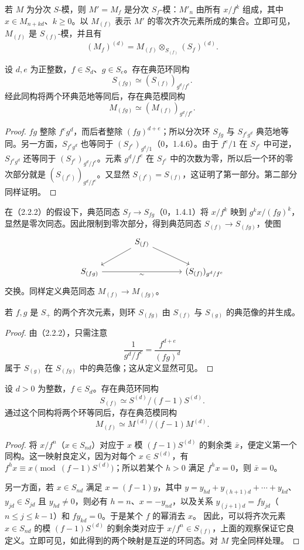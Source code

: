 若 $M$ 为分次 $S$-模，则 $M'=M_f$ 是分次 $S_f$-模：$M'_n$ 由所有 $x/f^k$ 组成，其中 $x\in M_{n+kd}$、$k\geq0$。以 $M_{(f)}$ 表示 $M'$ 的零次齐次元素所成的集合。立即可见，$M_{(f)}$ 是 $S_{(f)}$-模，并且有
\[
(M_f)^{(d)}=M_{(f)}\otimes_{S_{(f)}}(S_f)^{(d)}.
\]

设 $d,e$ 为正整数，$f\in S_d$、$g\in S_e$。存在典范环同构
\[
S_{(fg)}\simeq(S_{(f)})_{g^d/f^e}.
\]
经此同构将两个环典范地等同后，存在典范模同构
\[
M_{(fg)}\simeq(M_{(f)})_{g^d/f^e}.
\]
\begin{proof}
$fg$ 整除 $f^eg^d$，而后者整除 $(fg)^{d+e}$；所以分次环 $S_{fg}$ 与 $S_{f^eg^d}$ 典范地等同。另一方面，$S_{f^eg^d}$ 也等同于 $(S_{f^e})_{g^d/1}$（0，1.4.6）。由于 $f^e/1$ 在 $S_{f^e}$ 中可逆，$S_{f^eg^d}$ 还等同于 $(S_{f^e})_{g^d/f^e}$。元素 $g^d/f^e$ 在 $S_{f^e}$ 中的次数为零，所以后一个环的零次部分就是
$(S_{(f^e)})_{g^d/f^e}$。又显然 $S_{(f^e)}=S_{(f)}$，这证明了第一部分。第二部分同样证明。
\end{proof}

在（2.2.2）的假设下，典范同态 $S_f\to S_{fg}$（0，1.4.1）将 $x/f^k$ 映到 $g^kx/(fg)^k$，显然是零次同态。因此限制到零次部分，得到典范同态 $S_{(f)}\to S_{(fg)}$，使图
\[
\begin{tikzcd}[column sep=large]
& S_{(f)} \arrow[dl] \arrow[dr] &\\
S_{(fg)} \arrow[rr,"\sim"'] && (S_{(f)})_{g^d/f^e}
\end{tikzcd}
\]
交换。同样定义典范同态 $M_{(f)}\to M_{(fg)}$。

若 $f,g$ 是 $S_+$ 的两个齐次元素，则环 $S_{(fg)}$ 由 $S_{(f)}$ 与 $S_{(g)}$ 的典范像的并生成。
\begin{proof}
由（2.2.2），只需注意
\[
\frac{1}{g^d/f^e}=\frac{f^{d+e}}{(fg)^d}
\]
属于 $S_{(g)}$ 在 $S_{(fg)}$ 中的典范像；这从定义显然可见。
\end{proof}

设 $d>0$ 为整数，$f\in S_d$。存在典范环同构
\[
S_{(f)}\simeq S^{(d)}/(f-1)S^{(d)}.
\]
通过这个同构将两个环等同后，存在典范模同构
\[
M_{(f)}\simeq M^{(d)}/(f-1)M^{(d)}.
\]
\begin{proof}
将 $x/f^n$（$x\in S_{nd}$）对应于 $x$ 模 $(f-1)S^{(d)}$ 的剩余类 $\bar x$，便定义第一个同构。这一映射良定义，因为对每个 $x\in S^{(d)}$，有
$f^hx\equiv x\pmod{(f-1)S^{(d)}}$；所以若某个 $h>0$ 满足 $f^hx=0$，则 $\bar x=0$。

另一方面，若 $x\in S_{nd}$ 满足 $x=(f-1)y$，其中
$y=y_{hd}+y_{(h+1)d}+\cdots+y_{kd}$、$y_{jd}\in S_{jd}$ 且 $y_{hd}\ne0$，则必有 $h=n$、$x=-y_{nd}$，以及关系
$y_{(j+1)d}=fy_{jd}$（$n\leq j\leq k-1$）和 $fy_{kd}=0$。于是某个 $f$ 的幂消去 $x$。
因此，可以将齐次元素 $x\in S_{nd}$ 的模 $(f-1)S^{(d)}$ 的剩余类对应于 $x/f^n\in S_{(f)}$，上面的观察保证它良定义。立即可见，如此得到的两个映射是互逆的环同态。对 $M$ 完全同样处理。
\end{proof}

